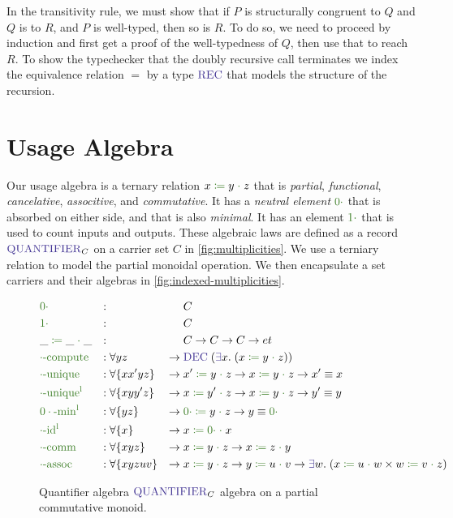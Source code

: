In the transitivity rule, we must show that if $P$ is structurally congruent to $Q$ and $Q$ is to $R$, and $P$ is well-typed, then so is $R$.
To do so, we need to proceed by induction and first get a proof of the well-typedness of $Q$, then use that to reach $R$.
To show the typechecker that the doubly recursive call terminates we index the equivalence relation $=$ by a type $\Rec$ that models the structure of the recursion.

\section{Usage Algebra}
\label{app:usage-algebra}


Our usage algebra is a ternary relation $\op{x}{y}{z}$ that is \emph{partial}, \emph{functional}, \emph{cancelative}, \emph{associtive}, and \emph{commutative}.
It has a \emph{neutral element} $\zero$ that is absorbed on either side, and that is also \emph{minimal}.
It has an element $\one$ that is used to count inputs and outputs.
These algebraic laws are defined as a record $\Quantifier_C$ on a carrier set $C$ in \autoref{fig:multiplicities}.
We use a terniary relation to model the partial monoidal operation.
We then encapsulate a set carriers and their algebras in \autoref{fig:indexed-multiplicities}.

\begin{figure}[h]
\begin{equation}
\begin{aligned}
  &\zero                  &:{} &                      &        & C \\
  &\one                   &:{} &                      &        & C \\
  &\op{\_}{\_}{\_}        &:{} &                      &        & C \to C \to C \to et \\
  &\func{\cdot-compute}  &:{} &\forall y z           & \to \; & \type{DEC} \; (\type{\exists} x . \; (\op{x}{y}{z})) \\
  &\func{\cdot-unique}   &:{} &\forall \{x x' y z\}  & \to \; & \op{x'}{y}{z} \to \op{x}{y}{z} \to x' \equiv x \\
  &\func{\cdot-unique^l} &:{} &\forall \{x y y' z\}  & \to \; & \op{x}{y'}{z} \to \op{x}{y}{z} \to y' \equiv y \\
  &\func{0\cdot-min^l}   &:{} &\forall \{y z\}       & \to \; & \op{\zero}{y}{z} \to y \equiv \zero \\
  &\func{\cdot-id^l}     &:{} &\forall \{x\}         & \to \; & \op{x}{\zero}{x} \\
  &\func{\cdot-comm}     &:{} &\forall \{x y z\}     & \to \; & \op{x}{y}{z} \to \op{x}{z}{y} \\
  &\func{\cdot-assoc}    &:{} &\forall \{x y z u v\} & \to \; & \op{x}{y}{z} \to \op{y}{u}{v} \to \type{\exists} w . \; (\op{x}{u}{w} \times \op{w}{v}{z})
\end{aligned}
\end{equation}
\caption{Quantifier algebra $\Quantifier_C$ algebra on a partial commutative monoid.}
\label{fig:multiplicities}
\end{figure}

